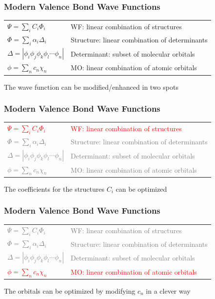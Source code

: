 \documentclass[]{beamer}
\begin{document}
\begin{frame}
  \frametitle{Modern Valence Bond Wave Functions}
  \begin{tabular}{ll}
    $\Psi = \sum_{i} C_i \Phi_i$ & WF: linear combination of structures \\
    $\Phi = \sum_{i} \alpha_i \Delta_i$ & Structure: linear combination of determinants \\
    $\Delta = |\phi_i\phi_j\phi_k\phi_l \cdots \phi_n|$ & Determinant: subset of molecular orbitals \\
    $\phi = \sum_{n} c_n \chi_n$ & MO: linear combination of atomic orbitals
  \end{tabular}
  \vspace{15px}
  \begin{center}
    The wave function can be modified/enhanced in two spots
  \end{center}
\end{frame}

\begin{frame}
  \frametitle{Modern Valence Bond Wave Functions}
  \begin{tabular}{ll}
    \textcolor{red}{$\Psi = \sum_{i} C_i \Phi_i$} & \textcolor{red}{WF: linear combination of structures} \\
    \textcolor{gray}{$\Phi = \sum_{i} \alpha_i \Delta_i$} & \textcolor{gray}{Structure: linear combination of determinants} \\
    \textcolor{gray}{$\Delta = |\phi_i\phi_j\phi_k\phi_l \cdots \phi_n|$} & \textcolor{gray}{Determinant: subset of molecular orbitals} \\
    \textcolor{gray}{$\phi = \sum_{n} c_n \chi_n$} & \textcolor{gray}{MO: linear combination of atomic orbitals}
  \end{tabular}
  \vspace{15px}
  \begin{center}
    The coefficients for the structures $C_i$ can be optimized
  \end{center}
\end{frame}

\begin{frame}
  \frametitle{Modern Valence Bond Wave Functions}
  \begin{tabular}{ll}
    \textcolor{gray}{$\Psi = \sum_{i} C_i \Phi_i$} & \textcolor{gray}{WF: linear combination of structures} \\
    \textcolor{gray}{$\Phi = \sum_{i} \alpha_i \Delta_i$} & \textcolor{gray}{Structure:  linear combination of determinants} \\
    \textcolor{gray}{$\Delta = |\phi_i\phi_j\phi_k\phi_l \cdots \phi_n|$} & \textcolor{gray}{Determinant: subset of molecular orbitals} \\
    \textcolor{red}{$\phi = \sum_{n} c_n \chi_n$} & \textcolor{red}{MO: linear combination of atomic orbitals}
  \end{tabular}
  \vspace{15px}
  \begin{center}
    The orbitals can be optimized by modifying $c_n$ in a clever way
  \end{center}
\end{frame}
\end{document}
